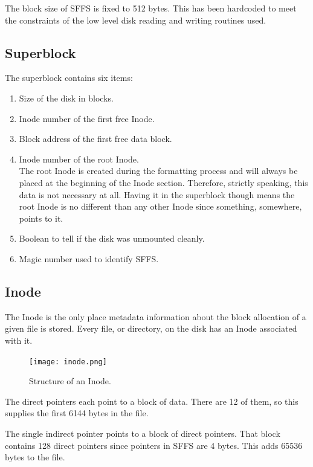 \documentclass[10pt,twocolumn]{article}
\begin{document}
  The block size of SFFS is fixed to 512 bytes. This has been hardcoded to meet
  the constraints of the low level disk reading and writing routines used.

  \subsection{Superblock}
  The superblock contains six items:
  \begin{enumerate}
    \item Size of the disk in blocks.
    \item Inode number of the first free Inode.
    \item Block address of the first free data block.
    \item Inode number of the root Inode.\\
          The root Inode is created during the formatting process and will
          always be placed at the beginning of the Inode section. Therefore,
          strictly speaking, this data is not necessary at all. Having it in
          the superblock though means the root Inode is no different than any
          other Inode since something, somewhere, points to it.
    \item Boolean to tell if the disk was unmounted cleanly.
    \item Magic number used to identify SFFS.
  \end{enumerate}

  \subsection{Inode}
  The Inode is the only place metadata information about the block allocation
  of a given file is stored. Every file, or directory, on the disk has an Inode   
  associated with it.
  \begin{figure}[h]
    \begin{center}
      \texttt{[image: inode.png]}
      \label{fig:inode}
      \caption{Structure of an Inode.}
    \end{center}
  \end{figure}
  
  The direct pointers each point to a block of data. There are 12 of them, so
  this supplies the first 6144 bytes in the file.

  The single indirect pointer points to a block of direct pointers. That block
  contains 128 direct pointers since pointers in SFFS are 4 bytes. This adds
  65536 bytes to the file.
\end{document}
